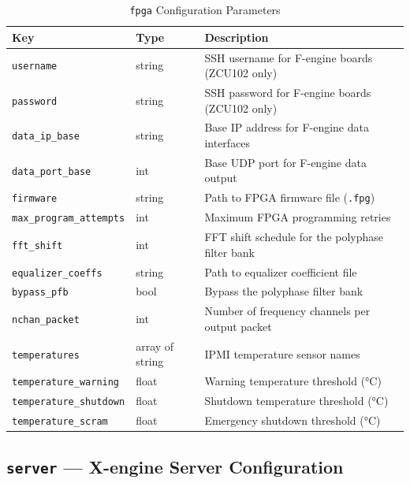 \begin{table}[htbp]
    \centering
    \caption{\texttt{fpga} Configuration Parameters}
    \label{tab:config-fpga}
    \begin{tabular}{llp{7cm}}
        \toprule
        \textbf{Key} & \textbf{Type} & \textbf{Description} \\
        \midrule
        \texttt{username}             & string         & SSH username for F-engine boards (ZCU102 only) \\
        \texttt{password}             & string         & SSH password for F-engine boards (ZCU102 only) \\
        \texttt{data\_ip\_base}       & string         & Base IP address for F-engine data interfaces \\
        \texttt{data\_port\_base}     & int            & Base UDP port for F-engine data output \\
        \texttt{firmware}             & string         & Path to FPGA firmware file (\texttt{.fpg}) \\
        \texttt{max\_program\_attempts} & int          & Maximum FPGA programming retries \\
        \texttt{fft\_shift}           & int            & FFT shift schedule for the polyphase filter bank \\
        \texttt{equalizer\_coeffs}    & string         & Path to equalizer coefficient file \\
        \texttt{bypass\_pfb}          & bool           & Bypass the polyphase filter bank \\
        \texttt{nchan\_packet}        & int            & Number of frequency channels per output packet \\
        \texttt{temperatures}         & array of string & IPMI temperature sensor names \\
        \texttt{temperature\_warning} & float          & Warning temperature threshold (\si{\degreeCelsius}) \\
        \texttt{temperature\_shutdown}& float          & Shutdown temperature threshold (\si{\degreeCelsius}) \\
        \texttt{temperature\_scram}   & float          & Emergency shutdown threshold (\si{\degreeCelsius}) \\
        \bottomrule
    \end{tabular}
\end{table}

\subsection{\texttt{server} --- X-engine Server Configuration}


